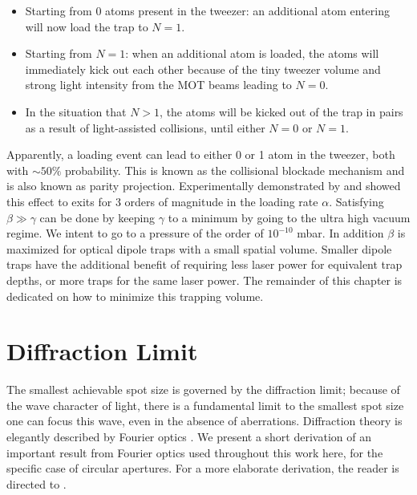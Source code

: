 \begin{itemize}
	\item Starting from 0 atoms present in the tweezer: an additional atom entering will now load the trap to $N=1$. 
	
	\item Starting from $N=1$: when an additional atom is loaded, the atoms will immediately kick out each other because of the tiny tweezer volume and strong light intensity from the MOT beams leading to $N=0$.
	
	\item In the situation that $N>1$, the atoms will be kicked out of the trap in pairs as a result of light-assisted collisions, until either $N=0$ or $N=1$.
\end{itemize}
Apparently, a loading event can lead to either 0 or 1 atom in the tweezer, both with $\sim 50\%$ probability. 
This is known as the collisional blockade mechanism and is also known as parity projection.
Experimentally demonstrated by \cite{Schlosser2001} and \cite{Schlosser2002} showed this effect to exits for 3 orders of magnitude in the loading rate $\alpha$.
Satisfying $\beta \gg \gamma$ can be done by keeping $\gamma$ to a minimum by going to the ultra high vacuum regime.
We intent to go to a pressure of the order of $10^{-10}$ mbar. In addition $\beta$ is maximized for optical dipole traps with a small spatial volume.
Smaller dipole traps have the additional benefit of requiring less laser power for equivalent trap depths, or more traps for the same laser power.
The remainder of this chapter is dedicated on how to minimize this trapping volume.

\section{Diffraction Limit}\label{sec:DiffractionLimit}

The smallest achievable spot size is governed by the diffraction limit; because of the wave character of light, there is a fundamental limit to the smallest spot size one can focus this wave, even in the absence of aberrations.
Diffraction theory is elegantly described by Fourier optics \cite{Goodman2005}. 
We present a short derivation of an important result from Fourier optics used throughout this work here, for the specific case of circular apertures.
For a more elaborate derivation, the reader is directed to \cite{Goodman2005}.

